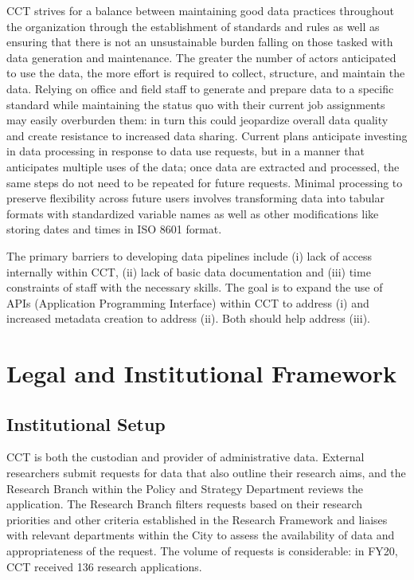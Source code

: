 CCT strives for a balance between maintaining good data practices throughout the organization through the establishment of standards and rules as well as ensuring that there is not an unsustainable burden falling on those tasked with data generation and maintenance. The greater the number of actors anticipated to use the data, the more effort is required to collect, structure, and maintain the data. Relying on office and field staff to generate and prepare data to a specific standard while maintaining the status quo with their current job assignments may easily overburden them: in turn this could jeopardize overall data quality and create resistance to increased data sharing. Current plans anticipate investing in data processing in response to data use requests, but in a manner that anticipates multiple uses of the data; once data are extracted and processed, the same steps do not need to be repeated for future requests. Minimal processing to preserve flexibility across future users involves transforming data into tabular formats with standardized variable names as well as other modifications like storing dates and times in ISO 8601 format.

The primary barriers to developing data pipelines include (i) lack of access internally within CCT, (ii) lack of basic data documentation and (iii) time constraints of staff with the necessary skills. The goal is to expand the use of APIs (Application Programming Interface) within CCT to address (i) and increased metadata creation to address (ii). Both should help address (iii).

\hypertarget{legal-and-institutional-framework-5}{%
\section{Legal and Institutional Framework}\label{legal-and-institutional-framework-5}}

\hypertarget{institutional-setup-5}{%
\subsection{Institutional Setup}\label{institutional-setup-5}}

CCT is both the custodian and provider of administrative data. External researchers submit requests for data that also outline their research aims, and the Research Branch within the Policy and Strategy Department reviews the application. The Research Branch filters requests based on their research priorities and other criteria established in the Research Framework and liaises with relevant departments within the City to assess the availability of data and appropriateness of the request. The volume of requests is considerable: in FY20, CCT received 136 research applications.

